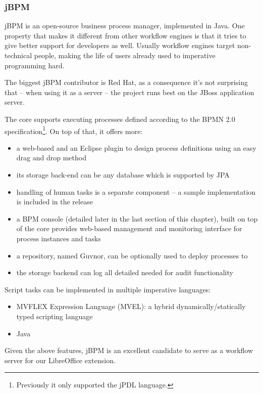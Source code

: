 \subsubsection*{jBPM}

jBPM\cite{jbpm} is an open-source business process manager, implemented in
Java. One property that makes it different from other workflow engines is that
it tries to give better support for developers as well. Usually workflow
engines target non-technical people, making the life of users already used to
imperative programming hard.

The biggest jBPM contributor is Red Hat, as a consequence it's not surprising
that -- when using it as a server -- the project runs best on the JBoss
application server.

The core supports executing processes defined according to the BPMN 2.0
specification\footnote{Previously it only supported the jPDL language.}. On top of that, it offers more:

\begin{itemize}
\item a web-based and an Eclipse plugin to design process definitions using an easy drag and drop method
\item its storage back-end can be any database which is supported by JPA
\item handling of human tasks is a separate component -- a sample implementation is included in the release
\item a BPM console (detailed later in the last section of this chapter), built
on top of the core provides web-based management and monitoring interface for
process instances and tasks
\item a repository, named Guvnor, can be optionally used to deploy processes to
\item the storage backend can log all detailed needed for audit functionality
\end{itemize}

Script tasks can be implemented in multiple imperative languages:

\begin{itemize}
\item MVFLEX Expression Language (MVEL): a hybrid dynamically/statically typed scripting language
\item Java
\end{itemize}

Given the above features, jBPM is an excellent candidate to serve as a workflow
server for our LibreOffice extension.

